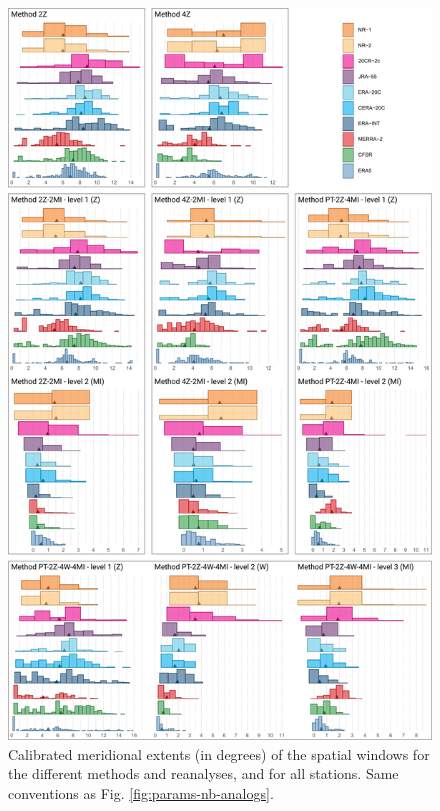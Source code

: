 \documentclass[alpha-refs]{wiley-article}
\begin{document}
\begin{figure}[btp]
	\centering
	\includegraphics[width=115mm]{figure-8.pdf}
	\caption{Calibrated meridional extents (in degrees) of the spatial windows for the different methods and reanalyses, and for all stations. Same conventions as Fig. \protect\ref{fig:params-nb-analogs}.}
	\label{fig:params-ywidth}
\end{figure}
\end{document}
